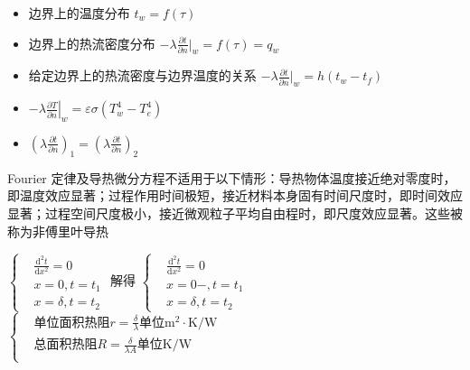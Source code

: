 \begin{itemize}
    \item {}边界上的温度分布 $t_w = f(\tau)$
    \item {}边界上的热流密度分布 $-\lambda \frac{\partial t}{\partial n}\vert _w = f(\tau)=q_w$
    \item {}给定边界上的热流密度与边界温度的关系 $-\lambda \frac{\partial t}{\partial n}\vert _w = h(t_w-t_f)$
    \item {} $-\lambda\left.\frac{\partial T}{\partial n}\right|_w=\varepsilon\sigma(T_w^4-T_e^4)$
    \item {} $\left(\lambda\frac{\partial t}{\partial n}\right)_1=\left(\lambda\frac{\partial t}{\partial n}\right)_2$
\end{itemize}

Fourier 定律及导热微分方程不适用于以下情形：导热物体温度接近绝对零度时，即温度效应显著；过程作用时间极短，接近材料本身固有时间尺度时，即时间效应显著；过程空间尺度极小，接近微观粒子平均自由程时，即尺度效应显著。这些被称为非傅里叶导热

\divider




$\left\{
    \begin{aligned}
         & \frac{\mathrm{d}^2 t}{\mathrm{d}x^2}=0 \\
         & x=0,t=t_1                              \\
         & x=\delta,t=t_2
    \end{aligned}
    \right.
$ 解得 $\left\{
    \begin{aligned}
         & \frac{\mathrm{d}^2 t}{\mathrm{d}x^2}=0 \\
         & x=0-,t=t_1                             \\
         & x=\delta,t=t_2
    \end{aligned}
    \right.$ $\left\{
    \begin{aligned}
         & \text{单位面积热阻} r=\frac{\delta }{\lambda} \text{单位} \mathrm{m^2\cdot K/W} \\
         & \text{总面积热阻} R=\frac{\delta}{\lambda A} \text{单位} \mathrm{K/W}          \\
    \end{aligned}
    \right.$

